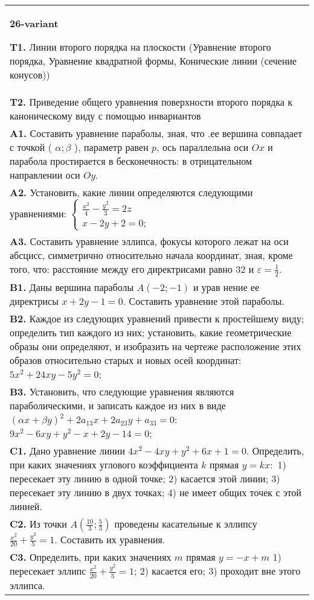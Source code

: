 \documentclass{article}
\begin{document}
\begin{tabular}{m{17cm}}
\textbf{26-variant}
\newline

\textbf{T1.} Линии второго порядка на плоскости (Уравнение второго порядка, Уравнение квадратной формы, Конические линии (сечение конусов)) \\
\textbf{T2.} Приведение общего уравнения поверхности второго порядка к каноническому виду с помощью инвариантов \\
\textbf{A1.} Составить уравнение параболы, зная, что .ее вершина совпадает с точкой ( $\alpha ; \beta$ ), параметр равен $p$, ось параллельна оси $O x$ и парабола простирается в бесконечность: в отрицательном направлении оси $O y$. \\
\textbf{A2.} Установить, какие линии определяются следующими уравнениями: $\left\{\begin{array}{l}\frac{x^2}{4}-\frac{y^2}{3}=2 z \\ x-2 y+2=0 ;\end{array}\right.$ \\
\textbf{A3.} Составить уравнение эллипса, фокусы которого лежат на оси абсцисс, симметрично относительно начала координат, зная, кроме того, что: расстояние между его директрисами равно 32 и $\varepsilon=\frac{1}{2}$. \\
\textbf{B1.} Даны вершина параболы $A(-2 ;-1)$ и урав нение ее директрисы $x+2 y-1=0$. Составить уравнение этой параболы. \\
\textbf{B2.} Каждое из следующих уравнений привести к простейшему виду; определить тип каждого из них; установить, какие геометрические образы они определяют, и изобразить на чертеже расположение этих образов относительно старых и новых осей координат: $5 x^2+24 x y-5 y^2=0$; \\
\textbf{B3.} Установить, что следующие уравнения являются параболическими, и записать каждое из них в виде $(\alpha x+\beta y)^2+2 a_{13} x+2 a_{23} y+a_{33}=0$: $9 x^2-6 x y+y^2-x+2 y-14=0$; \\
\textbf{C1.} Дано уравнение линии $4 x^2-4 x y+y^2+6 x+1=0$. Определить, при каких значениях углового коэффициента $k$ прямая $y=k x:$ 1) пересекает эту линию в одной точке; 2) касается этой линии; 3) пересекает эту линию в двух точках; 4) не имеет общих точек с этой линией. \\
\textbf{C2.} Из точки $A\left(\frac{10}{3} ; \frac{5}{3}\right)$ проведены касательные к эллипсу $\frac{x^2}{20}+\frac{y^2}{5}=1$. Составить их уравнения. \\
\textbf{C3.} Определить, при каких значениях $m$ прямая $y=-x+m$ 1) пересекает эллипс $\frac{x^2}{20}+\frac{y^2}{5}=1$; 2) касается его; 3) проходит вне этого эллипса. \\

\end{tabular}
\vspace{1cm}
\end{document}
